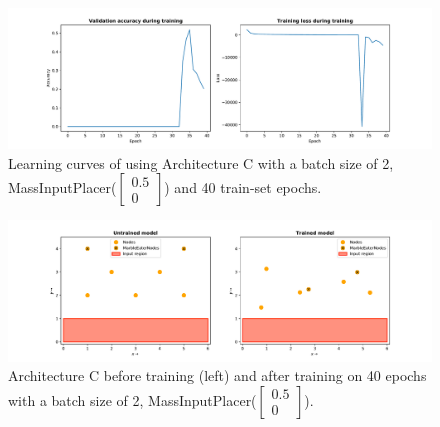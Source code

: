 \begin{figure}[hb]
	\centering
	\includegraphics[scale=0.4]{figures/C_batch1_ConstVelInputPlacer([0.5, 0]])_epoch40_stats.pdf}
	\caption{Learning curves of using Architecture C with 
		a batch size of 2, MassInputPlacer($\begin{bmatrix} 0.5\\0\end{bmatrix}$) and 40 train-set epochs.}
	\label{fig:arch_c_const_vel_50pc_learning_curve}
\end{figure}

\begin{figure}[hb]
	\centering
	\includegraphics[scale=0.4]{figures/C_batch1_ConstVelInputPlacer([0.5, 0]])_epoch40.pdf}
	\caption{Architecture C before training (left) and after training on 40 epochs with 
		a batch size of 2, MassInputPlacer($\begin{bmatrix} 0.5\\0\end{bmatrix}$).}
	\label{fig:arch_c_const_vel_50pc_architecture}
\end{figure}

\clearpage